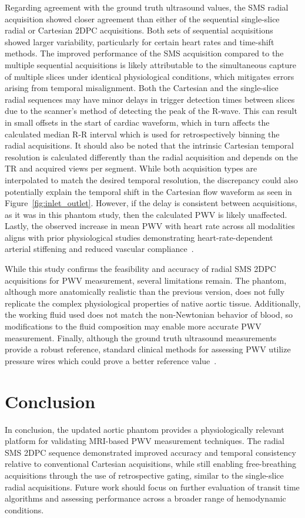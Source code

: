 Regarding agreement with the ground truth ultrasound values, the SMS radial acquisition showed closer agreement than either of the sequential single-slice radial or Cartesian 2DPC acquisitions. Both sets of sequential acquisitions showed larger variability, particularly for certain heart rates and time-shift methods. The improved performance of the SMS acquisition compared to the multiple sequential acquisitions is likely attributable to the simultaneous capture of multiple slices under identical physiological conditions, which mitigates errors arising from temporal misalignment. Both the Cartesian and the single-slice radial sequences may have minor delays in trigger detection times between slices due to the scanner's method of detecting the peak of the R-wave. This can result in small offsets in the start of cardiac waveform, which in turn affects the calculated median R-R interval which is used for retrospectively binning the radial acquisitions\@. It should also be noted that the intrinsic Cartesian temporal resolution is calculated differently than the radial acquisition and depends on the TR and acquired views per segment. While both acquisition types are interpolated to match the desired temporal resolution, the discrepancy could also potentially explain the temporal shift in the Cartesian flow waveform as seen in Figure~\ref{fig:inlet_outlet}. However, if the delay is consistent between acquisitions, as it was in this phantom study, then the calculated PWV is likely unaffected. Lastly, the observed increase in mean PWV with heart rate across all modalities aligns with prior physiological studies demonstrating heart-rate-dependent arterial stiffening and reduced vascular compliance~\cite{moraviaVitroFlowStudy2022}. 

While this study confirms the feasibility and accuracy of radial SMS 2DPC acquisitions for PWV measurement, several limitations remain. The phantom, although more anatomically realistic than the previous version, does not fully replicate the complex physiological properties of native aortic tissue. Additionally, the working fluid used does not match the non-Newtonian behavior of blood, so modifications to the fluid composition may enable more accurate PWV measurement. Finally, although the ground truth ultrasound measurements provide a robust reference, standard clinical methods for assessing PWV utilize pressure wires which could prove a better reference value~\cite{doguiMeasurementAorticArch2011}.

\section{Conclusion}\label{sec:phantom_conclusion}
In conclusion, the updated aortic phantom provides a physiologically relevant platform for validating MRI-based PWV measurement techniques. The radial SMS 2DPC sequence demonstrated improved accuracy and temporal consistency relative to conventional Cartesian acquisitions, while still enabling free-breathing acquisitions through the use of retrospective gating, similar to the single-slice radial acquisitions. Future work should focus on further evaluation of transit time algorithms and assessing performance across a broader range of hemodynamic conditions.

